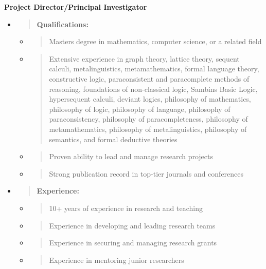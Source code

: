 \textbf{Project Director/Principal Investigator}

\begin{itemize}
\item
  \begin{quote}
  \textbf{Qualifications:\\
  }
  \end{quote}

  \begin{itemize}
  \item
    \begin{quote}
    Master\textquotesingle s degree in mathematics, computer science, or
    a related field
    \end{quote}
  \item
    \begin{quote}
    Extensive experience in graph theory, lattice theory, sequent
    calculi, metalinguistics, metamathematics, formal language theory,
    constructive logic, paraconsistent and paracomplete methods of
    reasoning, foundations of non-classical logic,
    Sambin\textquotesingle s Basic Logic, hypersequent calculi, deviant
    logics, philosophy of mathematics, philosophy of logic, philosophy
    of language, philosophy of paraconsistency, philosophy of
    paracompleteness, philosophy of metamathematics, philosophy of
    metalinguistics, philosophy of semantics, and formal deductive
    theories
    \end{quote}
  \item
    \begin{quote}
    Proven ability to lead and manage research projects
    \end{quote}
  \item
    \begin{quote}
    Strong publication record in top-tier journals and conferences
    \end{quote}
  \end{itemize}
\item
  \begin{quote}
  \textbf{Experience:\\
  }
  \end{quote}

  \begin{itemize}
  \item
    \begin{quote}
    10+ years of experience in research and teaching
    \end{quote}
  \item
    \begin{quote}
    Experience in developing and leading research teams
    \end{quote}
  \item
    \begin{quote}
    Experience in securing and managing research grants
    \end{quote}
  \item
    \begin{quote}
    Experience in mentoring junior researchers
    \end{quote}
  \end{itemize}
\end{itemize}

